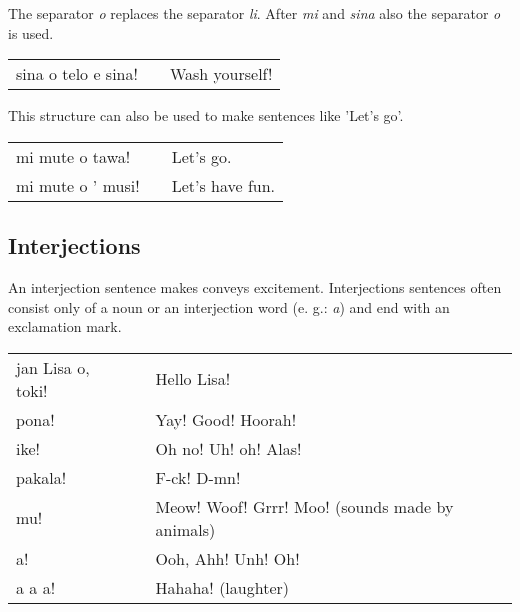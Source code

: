 The separator \textit{o} replaces the separator \textit{li}. After \textit{mi} and \textit{sina} also the separator \textit{o} is used.

\begin{supertabular}{p{5,5cm}|ll}
    sina o telo e sina! &  & Wash yourself! \\
\end{supertabular}

This structure can also be used to make sentences like 'Let's go'.

\begin{supertabular}{p{5,5cm}|ll}
    mi mute o tawa!   &  & Let's go.       \\
    mi mute o ' musi! &  & Let's have fun. \\
\end{supertabular}
%
{}
\subsection*{Interjections}
%
An interjection sentence makes conveys excitement.
Interjections sentences often consist only of a noun or an interjection word (e. g.: \textit{a}) and end with an exclamation mark.

\begin{supertabular}{p{5,5cm}|ll}
    jan Lisa o, toki! &  & Hello Lisa!                                     \\
    pona!             &  & Yay! Good! Hoorah!                              \\
    ike!              &  & Oh no! Uh! oh! Alas!                            \\
    pakala!           &  & F-ck! D-mn!                                     \\
    mu!               &  & Meow! Woof! Grrr! Moo! (sounds made by animals) \\
    a!                &  & Ooh, Ahh! Unh! Oh!                              \\
    a a a!            &  & Hahaha! (laughter)                              \\
\end{supertabular}

